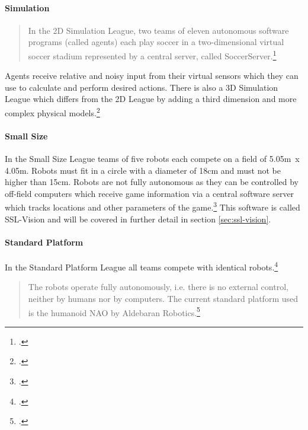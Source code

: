 \paragraph{Simulation}
\begin{quote}
In the 2D Simulation League, two teams of eleven autonomous software programs
(called agents) each play soccer in a two-dimensional virtual soccer stadium
represented by a central server, called SoccerServer.\footcite[][]{robo_simu_wiki}

\end{quote}
Agents receive relative and noisy input from their virtual sensors which they can use to
calculate and perform desired actions. There is also a 3D Simulation League which differs
from the 2D League by adding a third dimension and more complex physical
models.\footcite[Cf.][]{robo_simu_wiki}
 
\paragraph{Small Size}
In the Small Size League teams of five robots each compete on a field of 5.05m~x 4.05m.
Robots must fit in a circle with a diameter of 18cm and must not be higher than 15cm.
Robots are not fully autonomous as they can be controlled by off-field computers which receive
game information via a central software server which tracks locations and other parameters
of the game.\footcite[Cf.][]{robo_ssl_wiki}
This software is called SSL-Vision and will be covered in further detail in section
\ref{sec:ssl-vision}.
 
\paragraph{Standard Platform}
In the Standard Platform League all teams compete with identical
robots.\footcite[Cf.][]{robo_std_wiki}
\begin{quotation}
The robots operate fully autonomously,
i.e. there is no external control, neither by humans nor by computers. The
current standard platform used is the humanoid NAO by Aldebaran
Robotics.\footcite[][]{robo_std_wiki}
\end{quotation}

